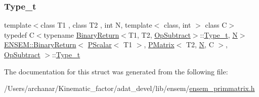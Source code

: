 \subsubsection{\texorpdfstring{Type\_t}{Type\_t}\hspace{0.1cm}{\footnotesize\ttfamily [2/2]}}
{\footnotesize\ttfamily template$<$class T1 , class T2 , int N, template$<$ class, int $>$ class C$>$ \\
typedef C$<$typename \mbox{\hyperlink{structENSEM_1_1BinaryReturn}{Binary\+Return}}$<$T1, T2, \mbox{\hyperlink{structENSEM_1_1OpSubtract}{Op\+Subtract}}$>$\+::\mbox{\hyperlink{structENSEM_1_1BinaryReturn_3_01PScalar_3_01T1_01_4_00_01PMatrix_3_01T2_00_01N_00_01C_01_4_00_01OpSubtract_01_4_a34bfaa23545607c65ea30b34a94971f1}{Type\+\_\+t}}, \mbox{\hyperlink{operator__name__util_8cc_a7722c8ecbb62d99aee7ce68b1752f337}{N}}$>$ \mbox{\hyperlink{structENSEM_1_1BinaryReturn}{E\+N\+S\+E\+M\+::\+Binary\+Return}}$<$ \mbox{\hyperlink{classENSEM_1_1PScalar}{P\+Scalar}}$<$ T1 $>$, \mbox{\hyperlink{classENSEM_1_1PMatrix}{P\+Matrix}}$<$ T2, \mbox{\hyperlink{operator__name__util_8cc_a7722c8ecbb62d99aee7ce68b1752f337}{N}}, C $>$, \mbox{\hyperlink{structENSEM_1_1OpSubtract}{Op\+Subtract}} $>$\+::\mbox{\hyperlink{structENSEM_1_1BinaryReturn_3_01PScalar_3_01T1_01_4_00_01PMatrix_3_01T2_00_01N_00_01C_01_4_00_01OpSubtract_01_4_a34bfaa23545607c65ea30b34a94971f1}{Type\+\_\+t}}}



The documentation for this struct was generated from the following file\+:\begin{DoxyCompactItemize}
\item 
/\+Users/archanar/\+Kinematic\+\_\+factor/adat\+\_\+devel/lib/ensem/\mbox{\hyperlink{lib_2ensem_2ensem__primmatrix_8h}{ensem\+\_\+primmatrix.\+h}}\end{DoxyCompactItemize}

